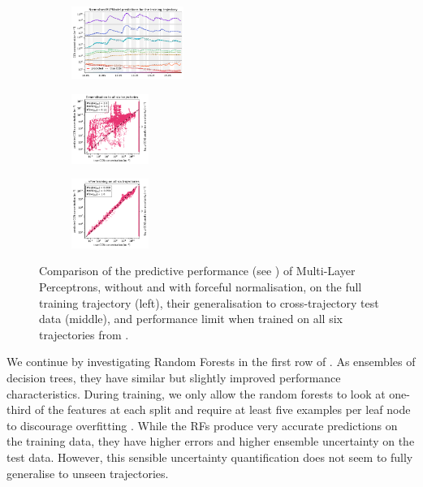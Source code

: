 \begin{figure}[H]
    \begin{subfigure}
    \centering
    \includegraphics[width=0.4\textwidth]{prediction/figures/models/normalisedmlpmodel-training-prediction.pdf}
    \end{subfigure}
    \begin{subfigure}
    \centering
    \includegraphics[width=0.275\textwidth]{prediction/figures/models/normalisedmlpmodel-test-generalisation.pdf}
    \end{subfigure}
    \begin{subfigure}
    \centering
    \includegraphics[width=0.275\textwidth]{prediction/figures/models/normalisedmlpmodel-test-prediction.pdf}
    \end{subfigure}

    \vspace{-1em}
    \caption[Predictive Performance of Multi-Layer Perceptrons]{Comparison of the predictive performance (see ) of Multi-Layer Perceptrons, without and with forceful normalisation, on the full training trajectory (left), their generalisation to cross-trajectory test data (middle), and performance limit when trained on all six trajectories from .}
    \label{fig:mlp-models}
\end{figure}

\noindent We continue by investigating Random Forests in the first row of . As ensembles of decision trees, they have similar but slightly improved performance characteristics. During training, we only allow the random forests to look at one-third of the features at each split and require at least five examples per leaf node to discourage overfitting \cite{statistical-learning-2009}. While the RFs produce very accurate predictions on the training data, they have higher errors and higher ensemble uncertainty on the test data. However, this sensible uncertainty quantification does not seem to fully generalise to unseen trajectories.

